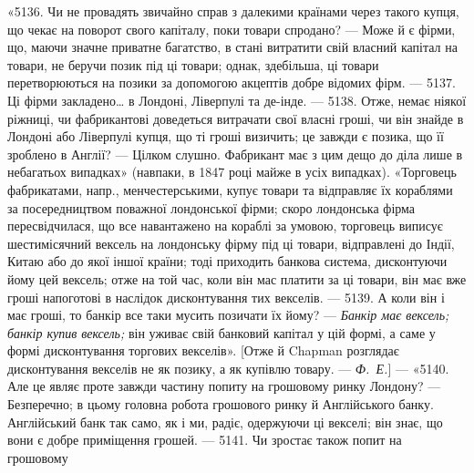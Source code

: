 «5136. Чи не провадять звичайно справ з далекими країнами через такого
купця, що чекає на поворот свого капіталу, поки товари спродано? — Може й
є фірми, що, маючи значне приватне багатство, в стані витратити свій власний
капітал на товари, не беручи позик під ці товари; однак, здебільша, ці товари
перетворюються на позики за допомогою акцептів добре відомих фірм. — 5137.
Ці фірми закладено\dots{} в Лондоні, Ліверпулі та де-інде. — 5138. Отже, немає ніякої
ріжниці, чи фабрикантові доведеться витрачати свої власні гроші, чи він знайде
в Лондоні або Ліверпулі купця, що ті гроші визичить; це завжди є позика, що
її зроблено в Англії? — Цілком слушно. Фабрикант має з цим дещо до діла лише
в небагатьох випадках» (навпаки, в 1847 році майже в усіх випадках). «Торговець
фабрикатами, напр., менчестерськими, купує товари та відправляє їх
кораблями за посередництвом поважної лондонської фірми; скоро лондонська фірма
пересвідчилася, що все навантажено на кораблі за умовою, торговець виписує
шестимісячний вексель на лондонську фірму під ці товари, відправлені до Індії,
Китаю або до якої іншої країни; тоді приходить банкова система, дисконтуючи
йому цей вексель; отже на той час, коли він мас платити за ці товари, він
має вже гроші напоготові в наслідок дисконтування тих векселів. — 5139. А коли
він і має гроші, то банкір все таки мусить позичати їх йому? — \emph{Банкір має
вексель; банкір купив вексель;} він уживає свій банковий капітал у цій формі,
а саме у формі дисконтування торгових векселів». [Отже й Chapman розглядає
дисконтування векселів не як позику, а як купівлю товару. — \emph{Ф.~Е.}] — «5140.
Але це являє проте завжди частину попиту на грошовому ринку Лондону? —
Безперечно; в цьому головна робота грошового ринку й Англійського банку.
Англійський банк так само, як і ми, радіє, одержуючи ці векселі; він знає, що
вони є добре приміщення грошей. — 5141. Чи зростає також попит на грошовому
\parbreak{}  %
